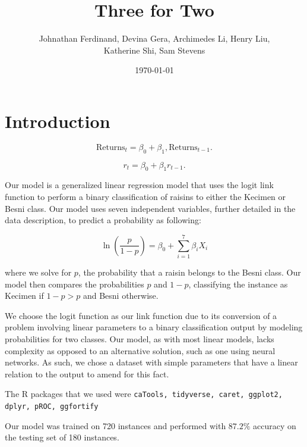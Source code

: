 \documentclass{article}
\title{Three for Two}
\author{Johnathan Ferdinand, Devina Gera, Archimedes Li, Henry Liu, \\Katherine Shi, Sam Stevens}
\date{\today}
\begin{document}
\maketitle

\section{Introduction}

\[
\text{Returns}_t = \beta_0 + \beta_1,\text{Returns}_{t-1}.
\]

\[
r_t = \beta_0 + \beta_1r_{t-1}.
\]

Our model is a generalized linear regression model that uses the logit link function to perform a binary classification of raisins to either the Kecimen or Besni class. Our model uses seven independent variables, further detailed in the data description, to predict a probability as following:

$$\ln \left( \frac{p}{1-p}\right) = \beta_0 + \sum_{i=1}^{7} \beta_i X_i$$

where we solve for $p$, the probability that a raisin belongs to the Besni class. Our model then compares the probabilities $p$ and $1-p$, classifying the instance as Kecimen if $1-p > p$ and Besni otherwise.

We choose the logit function as our link function due to its conversion of a problem involving linear parameters to a binary classification output by modeling probabilities for two classes. Our model, as with most linear models, lacks complexity as opposed to an alternative solution, such as one using neural networks. As such, we chose a dataset with simple parameters that have a linear relation to the output to amend for this fact.

The R packages that we used were \texttt{caTools, tidyverse, caret, ggplot2, dplyr, pROC, ggfortify}

Our model was trained on 720 instances and performed with $87.2\%$ accuracy on the testing set of 180 instances.
\end{document}
